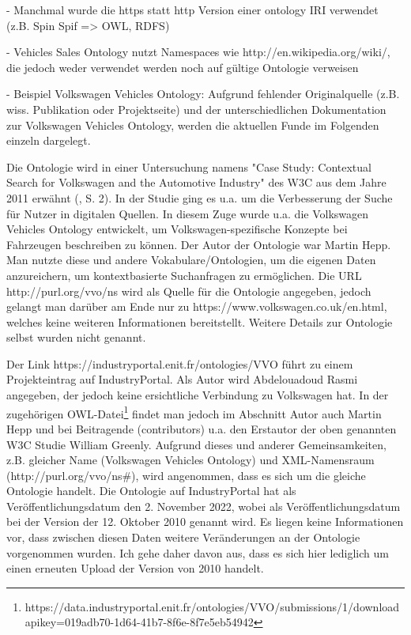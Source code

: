 \documentclass{article}
\begin{document}
- Manchmal wurde die https statt http Version einer ontology IRI verwendet (z.B. Spin Spif => OWL, RDFS)

- Vehicles Sales Ontology nutzt Namespaces wie http://en.wikipedia.org/wiki/, die jedoch weder verwendet werden noch auf gültige Ontologie verweisen

%

  - Beispiel Volkswagen Vehicles Ontology: Aufgrund fehlender Originalquelle (z.B. wiss. Publikation oder Projektseite) und der unterschiedlichen Dokumentation zur Volkswagen Vehicles Ontology, werden die aktuellen Funde im Folgenden einzeln dargelegt.

Die Ontologie wird in einer Untersuchung namens "Case Study: Contextual Search for Volkswagen and the Automotive Industry" des W3C aus dem Jahre 2011 erwähnt (\cite{greenly2011case}, S. 2).
In der Studie ging es u.a. um die Verbesserung der Suche für Nutzer in digitalen Quellen.
In diesem Zuge wurde u.a. die Volkswagen Vehicles Ontology entwickelt, um Volkswagen-spezifische Konzepte bei Fahrzeugen beschreiben zu können.
Der Autor der Ontologie war Martin Hepp.
Man nutzte diese und andere Vokabulare/Ontologien, um die eigenen Daten anzureichern, um kontextbasierte Suchanfragen zu ermöglichen.
Die URL http://purl.org/vvo/ns wird als Quelle für die Ontologie angegeben, jedoch gelangt man darüber am Ende nur zu https://www.volkswagen.co.uk/en.html, welches keine weiteren Informationen bereitstellt.
Weitere Details zur Ontologie selbst wurden nicht genannt.

Der Link https://industryportal.enit.fr/ontologies/VVO führt zu einem Projekteintrag auf IndustryPortal.
Als Autor wird Abdelouadoud Rasmi angegeben, der jedoch keine ersichtliche Verbindung zu Volkswagen hat.
In der zugehörigen OWL-Datei\footnote{https://data.industryportal.enit.fr/ontologies/VVO/submissions/1/downloadapikey=019adb70-1d64-41b7-8f6e-8f7e5eb54942} findet man jedoch im Abschnitt Autor auch Martin Hepp und bei Beitragende (contributors) u.a. den Erstautor der oben genannten W3C Studie William Greenly.
Aufgrund dieses und anderer Gemeinsamkeiten, z.B. gleicher Name (Volkswagen Vehicles Ontology) und XML-Namensraum (http://purl.org/vvo/ns\#), wird angenommen, dass es sich um die gleiche Ontologie handelt. Die Ontologie auf IndustryPortal hat als Veröffentlichungsdatum den 2. November 2022, wobei als Veröffentlichungsdatum bei der Version der 12. Oktober 2010 genannt wird.
Es liegen keine Informationen vor, dass zwischen diesen Daten weitere Veränderungen an der Ontologie vorgenommen wurden.
Ich gehe daher davon aus, dass es sich hier lediglich um einen erneuten Upload der Version von 2010 handelt.
\end{document}

